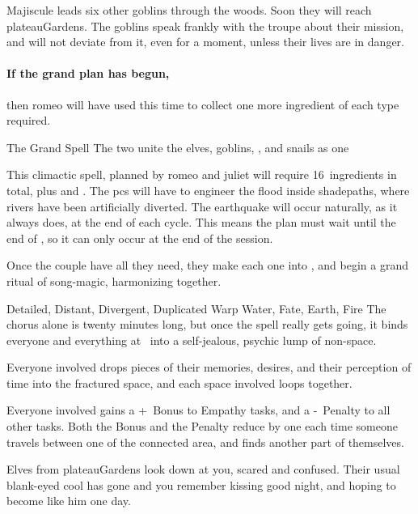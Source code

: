 \begin{multicols}{2}
Majiscule leads six other goblins through the woods.
Soon they will reach \gls{plateauGardens}.
The goblins speak frankly with the troupe about their mission, and will not deviate from it, even for a moment, unless their lives are in danger.

\paragraph{If the grand plan has begun,}
then \gls{romeo} will have used this time to collect one more \gls{ingredient} of each type required.

{The Grand Spell}%
{The two unite the elves, goblins, , and snails as one}%
\label{grandSpell}

This climactic spell, planned by \gls{romeo} and \gls{juliet} will require 16~\glspl{ingredient} in total, plus  and .
The \glspl{pc} will have to engineer the \gls{flood} inside \gls{shadepaths}, where rivers have been artificially diverted.
The \gls{earthquake} will occur naturally, as it always does, at the end of each \gls{cycle}.
This means the plan must wait until the end of \showCycle, so it can only occur at the end of the session.

Once the couple have all they need, they make each one into , and begin a grand ritual of song-magic, harmonizing together.

  {Detailed, Distant, Divergent, Duplicated}%
  {Warp}%
  {Water, Fate, Earth, Fire}%
  {}%
  {The chorus alone is twenty minutes long, but once the spell really gets going, it binds everyone and everything at \spellRange\ into a self-jealous, psychic lump of non-space.}%
  {Everyone involved drops pieces of their memories, desires, and their perception of time into the fractured space, and each space involved loops together.

  Everyone involved gains a +~Bonus to Empathy tasks, and a -~Penalty to all other tasks.
  Both the Bonus and the Penalty reduce by one each time someone travels between one of the connected area, and finds another part of themselves.}

\begin{boxtext}
  Elves from \gls{plateauGardens} look down at you, scared and confused.
  Their usual blank-eyed cool has gone and you remember kissing  good night, and hoping to become like him one day.


\end{boxtext}
\end{multicols}
